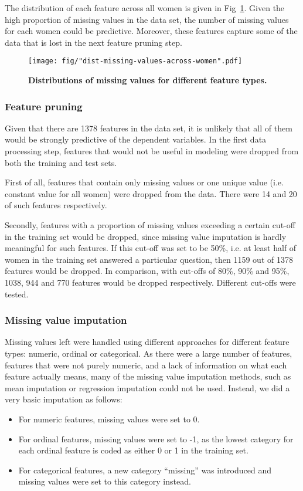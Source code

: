 \documentclass{article}\usepackage[]{graphicx}\usepackage[]{color}
\begin{document}
The distribution of each feature across all women is given in Fig~\ref{fig-feature-engin}. Given the high proportion of missing values in the data set, the number of missing values for each women could be predictive. Moreover, these features capture some of the data that is lost in the next feature pruning step.

\begin{figure}[htbp]
\begin{center}
\texttt{[image: fig/"dist-missing-values-across-women".pdf]}
\caption{\textbf{Distributions of missing values for different feature types.}}
\label{fig-feature-engin}
\end{center}
\end{figure}

\subsubsection{Feature pruning}
Given that there are 1378 features in the data set, it is unlikely that all of them would be strongly predictive of the dependent variables. In the first data processing step, features that would not be useful in modeling were dropped from both the training and test sets.

First of all, features that contain only missing values or one unique value (i.e. constant value for all women) were dropped from the data. There were 14 and 20 of such features respectively.

Secondly, features with a proportion of missing values exceeding a certain cut-off in the training set would be dropped, since missing value imputation is hardly meaningful for such features. If this cut-off was set to be 50\%, i.e. at least half of women in the training set answered a particular question, then 1159 out of 1378 features would be dropped. In comparison, with cut-offs of 80\%, 90\% and 95\%, 1038, 944 and 770 features would be dropped respectively. Different cut-offs were tested.

\subsubsection{Missing value imputation}
Missing values left were handled using different approaches for different feature types: numeric, ordinal or categorical. As there were a large number of features, features that were not purely numeric, and a lack of information on what each feature actually means, many of the missing value imputation methods, such as mean imputation or regression imputation could not be used. Instead, we did a very basic imputation as follows:
\begin{itemize}
  \item For numeric features, missing values were set to 0.
  \item For ordinal features, missing values were set to -1, as the lowest category for each ordinal feature is coded as either 0 or 1 in the training set.
  \item For categorical features, a new category ``missing'' was introduced and missing values were set to this category instead.
\end{itemize}
\end{document}
